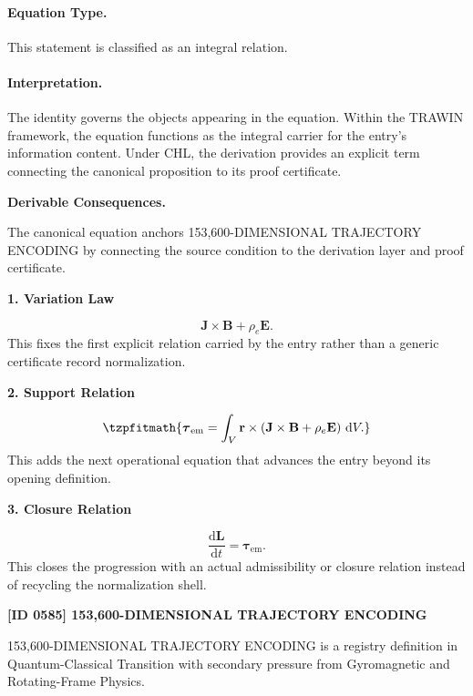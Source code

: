 \paragraph{Equation Type.}
This statement is classified as an integral relation.

\paragraph{Interpretation.}
The identity governs the objects appearing in the equation. Within the TRAWIN framework, the equation functions as the integral carrier for the entry’s information content. Under CHL, the derivation provides an explicit term connecting the canonical proposition to its proof certificate.

\par\vspace{0.35em}
\noindent\textbf{Derivable Consequences.}\quad
\begingroup
\footnotesize
\raggedright
The canonical equation anchors 153,600-DIMENSIONAL TRAJECTORY ENCODING by connecting the source condition to the derivation layer and proof certificate.
\par\endgroup

\noindent\textbf{1. Variation Law}\par
\[
\mathbf{J}\times\mathbf{B} + \rho_e\mathbf{E}.
\]
\noindent This fixes the first explicit relation carried by the entry rather than a generic certificate record normalization.\par
\noindent\textbf{2. Support Relation}\par
\[
\tzpfitmath{\boldsymbol{\tau}_{\mathrm{em}} = \int_V \mathbf{r}\times \left( \mathbf{J}\times\mathbf{B} + \rho_e\mathbf{E} \right) \,\mathrm{d}V.}
\]
\noindent This adds the next operational equation that advances the entry beyond its opening definition.\par
\noindent\textbf{3. Closure Relation}\par
\[
\frac{\mathrm{d}\mathbf{L}}{\mathrm{d}t} = \boldsymbol{\tau}_{\mathrm{em}}.
\]
\noindent This closes the progression with an actual admissibility or closure relation instead of recycling the normalization shell.\par

\clearpage
\noindent\textbf{[ID 0585] 153,600-DIMENSIONAL TRAJECTORY ENCODING}\par
\vspace{0.35em}
\begingroup\small
{}
153,600-DIMENSIONAL TRAJECTORY ENCODING is a registry definition in Quantum-Classical Transition with secondary pressure from Gyromagnetic and Rotating-Frame Physics.

